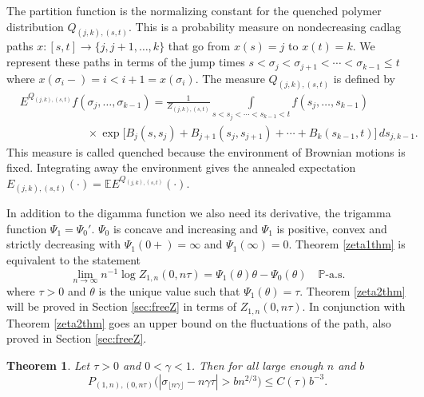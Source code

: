 \documentclass[11pt]{amsart}
\newtheorem{theorem}{\sc Theorem}[section]
\numberwithin{equation}{section}
\theoremstyle{remark}
\begin{document}
 
The partition function is the normalizing constant for the quenched polymer 
distribution $Q_{(j,k),(s,t)}$.  This is a probability measure on 
nondecreasing cadlag paths  
  $x:[s,t]\to\{j,j+1,\dotsc,k\}$ that go from $x(s)=j$ to $x(t)=k$.  We represent these
paths   in terms of the jump times 
 $s<\sigma_j<\sigma_{j+1}<\dotsm<\sigma_{k-1}\le t $ {where}
$x(\sigma_i-) = i< i+1=x(\sigma_i)$.  
The   measure $Q_{(j,k),(s,t)}$ is defined   by 
\begin{equation}\begin{aligned} 
&E^{Q_ {(j,k),(s,t)}}f(\sigma_j,\dotsc,\sigma_{k-1})  
=\frac1{Z_{{(j,k),(s,t)}}} 
\int\limits_{s<s_{j}<\dotsm<s_{k-1}<t}  f(s_j,\dotsc, s_{k-1}) 
 \\[7pt]
 &\qquad\qquad\qquad  \times  \exp\bigl[ B_j(s,s_j) +B_{j+1}(s_j,s_{j+1})
+\dotsm + B_k(s_{k-1},t) \bigr] \,ds_{j,k-1}.
\end{aligned}\label{Qdefjkst}\end{equation}
This measure is called quenched because the environment of Brownian motions
is fixed.  Integrating away  the environment gives the 
annealed expectation  $E_{(j,k),(s,t)}(\cdot)={\mathbb{E}} E^{Q_{(j,k),(s,t)}}(\cdot)$.  

In addition to the digamma function we also need its derivative, the trigamma function ${\Psi_1}={\Psi_0}'$.
${\Psi_0}$ is concave and increasing and ${\Psi_1}$ is positive, convex
and strictly decreasing with ${\Psi_1}(0+)=\infty$ and ${\Psi_1}(\infty)=0$.
Theorem \ref{zeta1thm} is equivalent to the statement 
\begin{equation} 
\lim_{n\to\infty}n^{-1}\log Z_{1,n}(0, n\tau)= {\Psi_1}({\theta}){\theta}- {\Psi_0}({\theta})
\quad \text{${\mathbb{P}}$-a.s.}
\label{Zlim5}\end{equation}
where   $\tau>0$ and   ${\theta}$ is the unique value such that  
${\Psi_1}({\theta})=\tau$. 
 Theorem \ref{zeta2thm} will be proved in Section \ref{sec:freeZ} in terms of 
$Z_{1,n}(0, n\tau)$.  In conjunction with Theorem \ref{zeta2thm} goes an upper
bound on the fluctuations of the path, also proved in Section \ref{sec:freeZ}.  

\begin{theorem}\label{thm:freepath2}
Let $\tau>0$ and    $0<\gamma<1$. Then for all large enough $n$
 and $b$    
\begin{equation} 
P_{(1,n),(0,n\tau)}\bigl(|\sigma_{\lfloor n \gamma\rfloor}-n\gamma \tau |>b n^{2/3}   \bigr)\le 
C(\tau) b^{-3}.
\end{equation} 
\end{theorem}
\end{document}
